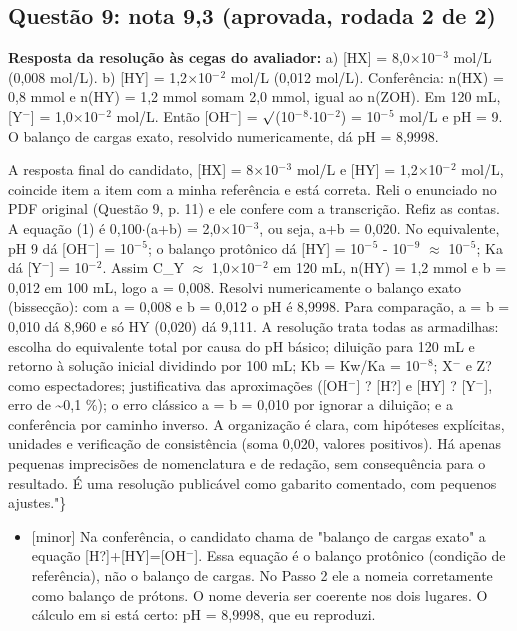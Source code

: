 \documentclass{article}%
\begin{document}
\subsection*{Questão 9: nota 9,3 (aprovada, rodada 2 de 2)}%
\textbf{Resposta da resolução às cegas do avaliador:} a) {[}HX{]} = 8,0$\times$10$^{-}$$^3$ mol/L (0,008 mol/L).\newline%
b) {[}HY{]} = 1,2$\times$10$^{-}$$^2$ mol/L (0,012 mol/L).\newline%
\newline%
Conferência: n(HX) = 0,8 mmol e n(HY) = 1,2 mmol somam 2,0 mmol, igual ao n(ZOH). Em 120 mL, {[}Y$^{-}${]} = 1,0$\times$10$^{-}$$^2$ mol/L. Então {[}OH$^{-}${]} = $\surd$(10$^{-}$$^{8}$$\cdot$10$^{-}$$^2$) = 10$^{-}$$^{5}$ mol/L e pH = 9. O balanço de cargas exato, resolvido numericamente, dá pH = 8,9998.\par %
A resposta final do candidato, {[}HX{]} = 8$\times$10$^{-}$$^3$ mol/L e {[}HY{]} = 1,2$\times$10$^{-}$$^2$ mol/L, coincide item a item com a minha referência e está correta. Reli o enunciado no PDF original (Questão 9, p. 11) e ele confere com a transcrição. Refiz as contas. A equação (1) é 0,100$\cdot$(a+b) = 2,0$\times$10$^{-}$$^3$, ou seja, a+b = 0,020. No equivalente, pH 9 dá {[}OH$^{-}${]} = 10$^{-}$$^{5}$; o balanço protônico dá {[}HY{]} = 10$^{-}$$^{5}$ - 10$^{-}$$^{9}$ $\approx$ 10$^{-}$$^{5}$; Ka dá {[}Y$^{-}${]} = 10$^{-}$$^2$. Assim C\_Y $\approx$ 1,0$\times$10$^{-}$$^2$ em 120 mL, n(HY) = 1,2 mmol e b = 0,012 em 100 mL, logo a = 0,008. Resolvi numericamente o balanço exato (bissecção): com a = 0,008 e b = 0,012 o pH é 8,9998. Para comparação, a = b = 0,010 dá 8,960 e só HY (0,020) dá 9,111. A resolução trata todas as armadilhas: escolha do equivalente total por causa do pH básico; diluição para 120 mL e retorno à solução inicial dividindo por 100 mL; Kb = Kw/Ka = 10$^{-}$$^{8}$; X$^{-}$ e Z? como espectadores; justificativa das aproximações ({[}OH$^{-}${]} ? {[}H?{]} e {[}HY{]} ? {[}Y$^{-}${]}, erro de \textasciitilde{}0,1 \%); o erro clássico a = b = 0,010 por ignorar a diluição; e a conferência por caminho inverso. A organização é clara, com hipóteses explícitas, unidades e verificação de consistência (soma 0,020, valores positivos). Há apenas pequenas imprecisões de nomenclatura e de redação, sem consequência para o resultado. É uma resolução publicável como gabarito comentado, com pequenos ajustes."\}%
\begin{itemize}%
\item%
{[}minor{]} Na conferência, o candidato chama de "balanço de cargas exato" a equação {[}H?{]}+{[}HY{]}={[}OH$^{-}${]}. Essa equação é o balanço protônico (condição de referência), não o balanço de cargas. No Passo 2 ele a nomeia corretamente como balanço de prótons. O nome deveria ser coerente nos dois lugares. O cálculo em si está certo: pH = 8,9998, que eu reproduzi.%

\end{itemize}$$
\end{document}
